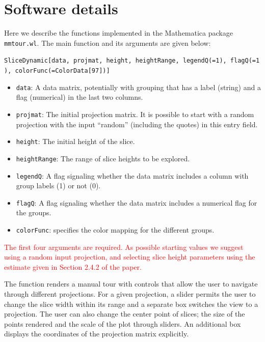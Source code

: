\documentclass[]{interact}
\theoremstyle{plain}%
\theoremstyle{definition}
\theoremstyle{remark}
\providecommand{\tightlist}{%
  \setlength{\itemsep}{0pt}\setlength{\parskip}{0pt}}
\def\tightlist{}
\begin{document}
\hypertarget{software-details}{%
\section{Software details}\label{software-details}}

Here we describe the functions implemented in the Mathematica package
\texttt{mmtour.wl}. The main function and its arguments are given below:

\texttt{SliceDynamic{[}data,\ projmat,\ height,\ heightRange,\ legendQ(=1),\ flagQ(=1),\ colorFunc(=ColorData{[}97{]}){]}}

\begin{itemize}
\tightlist
\item
  \texttt{data}: A data matrix, potentially with grouping that has a
  label (string) and a flag (numerical) in the last two columns.
\item
  \texttt{projmat}: The initial projection matrix. It is possible to
  start with a random projection with the input ``random'' (including
  the quotes) in this entry field.
\item
  \texttt{height}: The initial height of the slice.
\item
  \texttt{heightRange}: The range of slice heights to be explored.
\item
  \texttt{legendQ}: A flag signaling whether the data matrix includes a
  column with group labels (1) or not (0).
\item
  \texttt{flagQ}: A flag signaling whether the data matrix includes a
  numerical flag for the groups.
\item
  \texttt{colorFunc}: specifies the color mapping for the different
  groups.
\end{itemize}

\textcolor{red}{The first four arguments are required. As possible starting values we suggest using a random input projection, and selecting slice height parameters using the estimate given in Section 2.4.2 of the paper.}

The function renders a manual tour with controls that allow the user to
navigate through different projections. For a given projection, a slider
permits the user to change the slice width within its range and a
separate box switches the view to a projection. The user can also change
the center point of slices; the size of the points rendered and the
scale of the plot through sliders. An additional box displays the
coordinates of the projection matrix explicitly.
\end{document}
